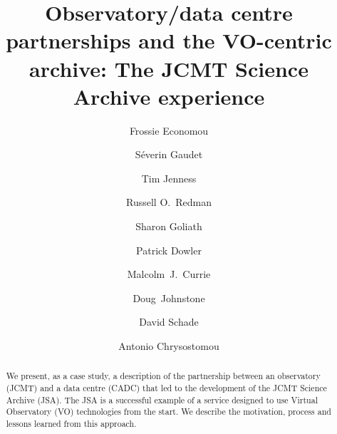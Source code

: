 \documentclass[final,authoryear,5p,times,twocolumn]{elsarticle}
\begin{document}
\begin{frontmatter}



\title{Observatory/data centre partnerships and the VO-centric archive:
  The JCMT Science Archive experience}


\author[lsst]{Frossie Economou}
\author[cadc]{S\'{e}verin Gaudet}
\author[cornell,jac]{Tim Jenness}
\author[jac]{Russell O.\ Redman}
\author[cadc]{Sharon Goliath}
\author[cadc]{Patrick Dowler}
\author[jac]{Malcolm~J.~Currie}
\author[jac]{Doug~Johnstone}
\author[cadc]{David Schade}
\author[uherts,jac]{Antonio Chrysostomou}



\address[lsst]{LSST Project Office, 933 N.\ Cherry Ave, Tucson, AZ 85721, USA}
\address[cadc]{Canadian Astronomy Data Centre, National Research Council of Canada, 5071 West Saanich Road., Victoria, BC V9E 2E7, Canada}
\address[cornell]{Department of Astronomy, Cornell University, Ithaca,
  NY 14853, USA}
\address[jac]{Joint Astronomy Centre, 660 N.\ A`oh\=ok\=u Place, Hilo, HI
  96720, USA}
\address[uherts]{Centre for Astrophysics Research, University of Hertfordshire, College Lane, Hatfield, Hertfordshire AL10 9AB, UK}

\begin{abstract}

  We present, as a case study, a description of the
  partnership between an observatory (JCMT) and a data centre (CADC)
  that led to the development of the JCMT Science Archive (JSA). The
  JSA is a successful example of a service designed to use Virtual Observatory (VO)
  technologies from the start. We describe the motivation, process and
  lessons learned from this approach.


\end{abstract}
\end{frontmatter}
\end{document}
